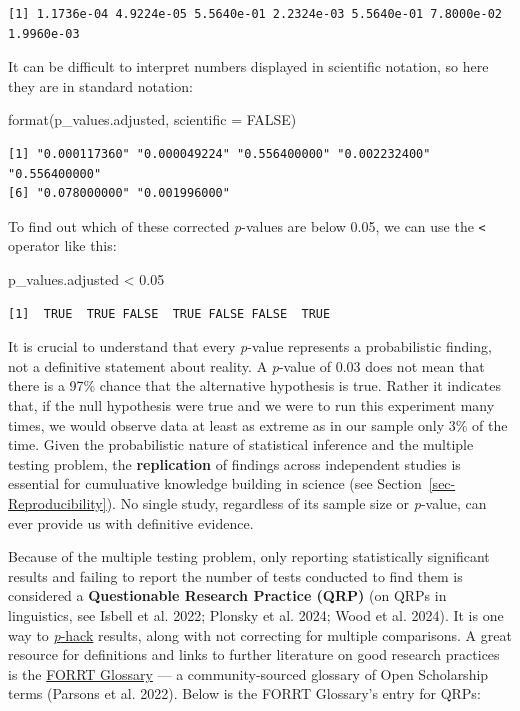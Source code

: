 \documentclass[
  letterpaper,
  DIV=11,
  numbers=noendperiod]{scrreprt}
\newenvironment{Shaded}{\begin{snugshade}}{\end{snugshade}}
\newcommand{\AttributeTok}[1]{\textcolor[rgb]{0.40,0.45,0.13}{#1}}
\newcommand{\ConstantTok}[1]{\textcolor[rgb]{0.56,0.35,0.01}{#1}}
\newcommand{\FloatTok}[1]{\textcolor[rgb]{0.68,0.00,0.00}{#1}}
\newcommand{\FunctionTok}[1]{\textcolor[rgb]{0.28,0.35,0.67}{#1}}
\newcommand{\NormalTok}[1]{\textcolor[rgb]{0.00,0.23,0.31}{#1}}
\newcommand{\SpecialCharTok}[1]{\textcolor[rgb]{0.37,0.37,0.37}{#1}}
\begin{document}
\begin{verbatim}
[1] 1.1736e-04 4.9224e-05 5.5640e-01 2.2324e-03 5.5640e-01 7.8000e-02 1.9960e-03
\end{verbatim}

It can be difficult to interpret numbers displayed in scientific
notation, so here they are in standard notation:

\begin{Shaded}
\begin{Highlighting}[]
\FunctionTok{format}\NormalTok{(p\_values.adjusted, }\AttributeTok{scientific =} \ConstantTok{FALSE}\NormalTok{)}
\end{Highlighting}
\end{Shaded}

\begin{verbatim}
[1] "0.000117360" "0.000049224" "0.556400000" "0.002232400" "0.556400000"
[6] "0.078000000" "0.001996000"
\end{verbatim}

To find out which of these corrected \emph{p}-values are below 0.05, we
can use the \texttt{\textless{}} operator like this:

\begin{Shaded}
\begin{Highlighting}[]
\NormalTok{p\_values.adjusted }\SpecialCharTok{\textless{}} \FloatTok{0.05}
\end{Highlighting}
\end{Shaded}

\begin{verbatim}
[1]  TRUE  TRUE FALSE  TRUE FALSE FALSE  TRUE
\end{verbatim}

It is crucial to understand that every \emph{p}-value represents a
probabilistic finding, not a definitive statement about reality. A
\emph{p}-value of 0.03 does not mean that there is a 97\% chance that
the alternative hypothesis is true. Rather it indicates that, if the
null hypothesis were true and we were to run this experiment many times,
we would observe data at least as extreme as in our sample only 3\% of
the time. Given the probabilistic nature of statistical inference and
the multiple testing problem, the \textbf{replication} of findings
across independent studies is essential for cumuluative knowledge
building in science (see Section~\ref{sec-Reproducibility}). No single
study, regardless of its sample size or \emph{p}-value, can ever provide
us with definitive evidence.

Because of the multiple testing problem, only reporting statistically
significant results and failing to report the number of tests conducted
to find them is considered a \textbf{Questionable Research Practice
(QRP)} (on QRPs in linguistics, see Isbell et al. 2022; Plonsky et al.
2024; Wood et al. 2024). It is one way to
\href{https://forrt.org/glossary/english/p_hacking/}{\emph{p}-hack}
results, along with not correcting for multiple comparisons. A great
resource for definitions and links to further literature on good
research practices is the \href{https://forrt.org/glossary}{FORRT
Glossary} --- a community-sourced glossary of Open Scholarship terms
({Parsons et al.} 2022). Below is the FORRT Glossary's entry for QRPs:
\end{document}
